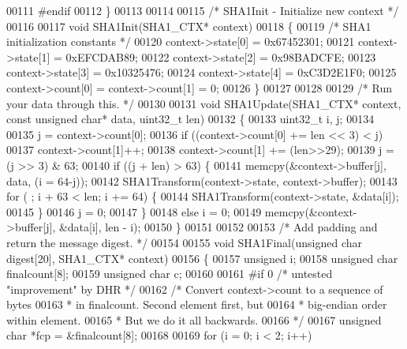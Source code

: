 \begin{DoxyCode}
{00111 \textcolor{preprocessor}{#}\textcolor{preprocessor}{endif}
00112 \}
00113 
00114 
00115 \textcolor{comment}{/* SHA1Init - Initialize new context */}
00116 
00117 \textcolor{keywordtype}{void} SHA1Init(SHA1\_CTX* context)
00118 \{
00119     \textcolor{comment}{/* SHA1 initialization constants */}
00120     context->state[0] = 0x67452301;
00121     context->state[1] = 0xEFCDAB89;
00122     context->state[2] = 0x98BADCFE;
00123     context->state[3] = 0x10325476;
00124     context->state[4] = 0xC3D2E1F0;
00125     context->count[0] = context->count[1] = 0;
00126 \}
00127 
00128 
00129 \textcolor{comment}{/* Run your data through this. */}
00130 
00131 \textcolor{keywordtype}{void} SHA1Update(SHA1\_CTX* context, \textcolor{keyword}{const} \textcolor{keywordtype}{unsigned} \textcolor{keywordtype}{char}* data, uint32\_t len)
00132 \{
00133     uint32\_t i, j;
00134 
00135     j = context->count[0];
00136     \textcolor{keywordflow}{if} ((context->count[0] += len << 3) < j)
00137         context->count[1]++;
00138     context->count[1] += (len>>29);
00139     j = (j >> 3) & 63;
00140     \textcolor{keywordflow}{if} ((j + len) > 63) \{
00141         memcpy(&context->buffer[j], data, (i = 64-j));
00142         SHA1Transform(context->state, context->buffer);
00143         \textcolor{keywordflow}{for} ( ; i + 63 < len; i += 64) \{
00144             SHA1Transform(context->state, &data[i]);
00145         \}
00146         j = 0;
00147     \}
00148     \textcolor{keywordflow}{else} i = 0;
00149     memcpy(&context->buffer[j], &data[i], len - i);
00150 \}
00151 
00152 
00153 \textcolor{comment}{/* Add padding and return the message digest. */}
00154 
00155 \textcolor{keywordtype}{void} SHA1Final(\textcolor{keywordtype}{unsigned} \textcolor{keywordtype}{char} digest[20], SHA1\_CTX* context)
00156 \{
00157     \textcolor{keywordtype}{unsigned} i;
00158     \textcolor{keywordtype}{unsigned} \textcolor{keywordtype}{char} finalcount[8];
00159     \textcolor{keywordtype}{unsigned} \textcolor{keywordtype}{char} c;
00160 
00161 \textcolor{preprocessor}{#}\textcolor{preprocessor}{if} 0   \textcolor{comment}{/* untested "improvement" by DHR */}
00162     \textcolor{comment}{/* Convert context->count to a sequence of bytes}
00163 \textcolor{comment}{     * in finalcount.  Second element first, but}
00164 \textcolor{comment}{     * big-endian order within element.}
00165 \textcolor{comment}{     * But we do it all backwards.}
00166 \textcolor{comment}{     */}
00167     \textcolor{keywordtype}{unsigned} \textcolor{keywordtype}{char} *fcp = &finalcount[8];
00168 
00169     \textcolor{keywordflow}{for} (i = 0; i < 2; i++)
}
\end{DoxyCode}
